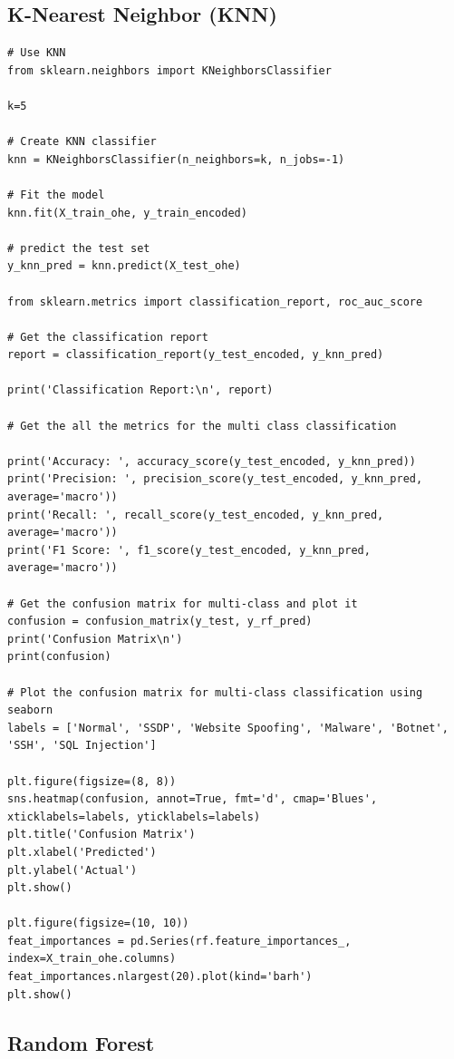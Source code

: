 \begin{appendices}
\subsection{K-Nearest Neighbor (KNN)}
\begin{lstlisting}
# Use KNN
from sklearn.neighbors import KNeighborsClassifier

k=5

# Create KNN classifier
knn = KNeighborsClassifier(n_neighbors=k, n_jobs=-1)

# Fit the model
knn.fit(X_train_ohe, y_train_encoded)

# predict the test set
y_knn_pred = knn.predict(X_test_ohe)

from sklearn.metrics import classification_report, roc_auc_score

# Get the classification report
report = classification_report(y_test_encoded, y_knn_pred)

print('Classification Report:\n', report)

# Get the all the metrics for the multi class classification

print('Accuracy: ', accuracy_score(y_test_encoded, y_knn_pred))
print('Precision: ', precision_score(y_test_encoded, y_knn_pred, average='macro'))
print('Recall: ', recall_score(y_test_encoded, y_knn_pred, average='macro'))
print('F1 Score: ', f1_score(y_test_encoded, y_knn_pred, average='macro'))

# Get the confusion matrix for multi-class and plot it
confusion = confusion_matrix(y_test, y_rf_pred)
print('Confusion Matrix\n')
print(confusion)

# Plot the confusion matrix for multi-class classification using seaborn
labels = ['Normal', 'SSDP', 'Website Spoofing', 'Malware', 'Botnet', 'SSH', 'SQL Injection']

plt.figure(figsize=(8, 8))
sns.heatmap(confusion, annot=True, fmt='d', cmap='Blues', xticklabels=labels, yticklabels=labels)
plt.title('Confusion Matrix')
plt.xlabel('Predicted')
plt.ylabel('Actual')
plt.show()

plt.figure(figsize=(10, 10))
feat_importances = pd.Series(rf.feature_importances_, index=X_train_ohe.columns)
feat_importances.nlargest(20).plot(kind='barh')
plt.show()
\end{lstlisting}

\newpage

\subsection{Random Forest}
\label{appx:Random Forest}


\end{appendices}
